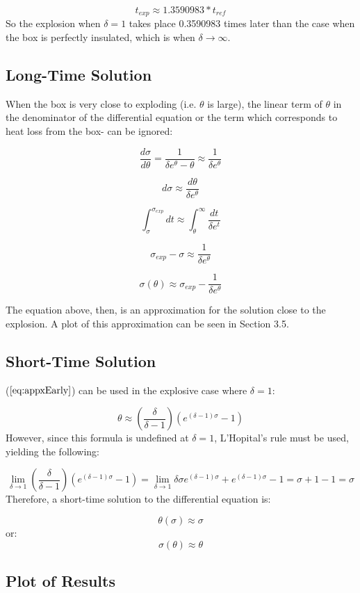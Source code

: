 \documentclass[12pt]{article}\pagestyle{myheadings}
\theoremstyle{plain}
\begin{document}
{\[ t_{exp} \approx 1.3590983* t_{ref} \]} So the explosion when $\delta = 1$ takes place 0.3590983 times later than the case when the box is perfectly insulated, which is when $\delta \rightarrow \infty$.


\subsection{Long-Time Solution}

When the box is very close to exploding (i.e. $\theta$ is large), the linear term of $\theta$ in the denominator of the differential equation or the term which corresponds to heat loss from the box- can be ignored:

{\[ \frac{d\sigma}{d\theta} = \frac{1}{\delta e^{\theta} - \theta} \approx \frac{1}{\delta e^{\theta}} \]}

{\[ d\sigma \approx \frac{d\theta}{\delta e^{\theta}} \]}

{\[ \int_{\sigma}^{\sigma_{exp}} dt \approx \int_{\theta}^{\infty} \frac{dt}{\delta e^{t}} \]}

{\[ \sigma_{exp} - \sigma \approx \frac{1}{\delta e^{\theta}}\]}

{\[\sigma(\theta) \approx \sigma_{exp} - \frac{1}{\delta e^{\theta}}\]}

The equation above, then, is an approximation for the solution close to the explosion. A plot of this approximation can be seen in Section 3.5.

\subsection{Short-Time Solution}

($\ref{eq:appxEarly}$) can be used in the explosive case where $\delta = 1$:

\[\theta \approx \left(\frac{\delta}{\delta - 1}\right) \left(e^{(\delta - 1)\sigma} - 1\right)\] However, since this formula is undefined at $\delta = 1$, L'Hopital's rule must be used, yielding the following:

\[\lim_{\delta \rightarrow 1} \left(\frac{\delta}{\delta - 1}\right) \left(e^{(\delta - 1)\sigma} - 1\right) = \lim_{\delta \rightarrow 1} \delta\sigma e^{(\delta -1) \sigma} + e^{(\delta-1)\sigma} -1 = \sigma + 1  - 1 = \sigma \] Therefore, a short-time solution to the differential equation is:

{\[\theta(\sigma) \approx \sigma\]} or:
{\[\sigma(\theta) \approx \theta\]}

\subsection{Plot of Results}
\end{document}
